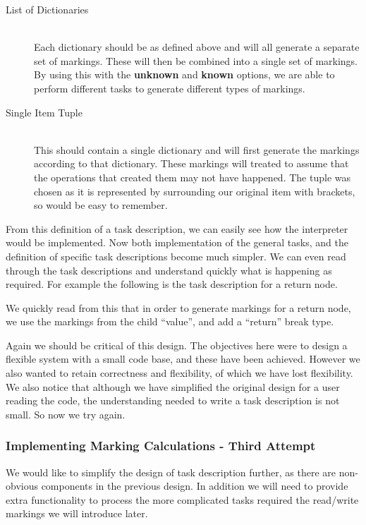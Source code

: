 \documentclass[twoside,a4paper]{report}
\begin{document}
\begin{description}
\item[List of Dictionaries] \hfill \\
Each dictionary should be as defined above and will all generate a separate set of markings. These will then be combined into a single set of markings.
By using this with the \textbf{unknown} and \textbf{known} options, we are able to perform different tasks to generate different types of markings.

\item[Single Item Tuple] \hfill \\
This should contain a single dictionary and will first generate the markings according to that dictionary. These markings will treated to assume that
the operations that created them may not have happened. The tuple was chosen as it is represented by surrounding our original item with brackets, so
would be easy to remember.
\end{description}

From this definition of a task description, we can easily see how the interpreter would be implemented. Now both implementation of the general tasks, and
the definition of specific task descriptions become much simpler. We can even read through the task descriptions and understand quickly what is happening
as required. For example the following is the task description for a return node.



We quickly read from this that in order to generate markings for a return node, we use the markings from the child ``value'', and add a ``return'' break type.

Again we should be critical of this design. The objectives here were to design a flexible system with a small code base, and these have been achieved.
However we also wanted to retain correctness and flexibility, of which we have lost flexibility. We also notice that although we have simplified the
original design for a user reading the code, the understanding needed to write a task description is not small. So now we try again.

\subsubsection{Implementing Marking Calculations - Third Attempt}

We would like to simplify the design of task description further, as there are non-obvious components in the previous design. In addition we will
need to provide extra functionality to process the more complicated tasks required the read/write markings we will introduce later.
\end{document}
